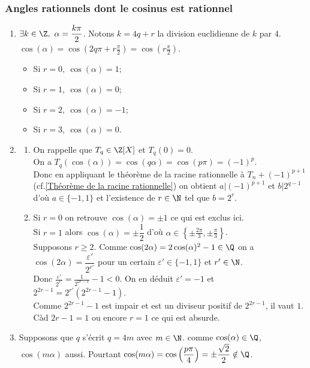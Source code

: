 \documentclass{book}
\begin{document}
	\subsubsection{Angles rationnels dont le cosinus est rationnel }
	\begin{enumerate}[leftmargin=*]
		\item $\exists k\in \Z,\ \alpha=\dfrac{k\pi}{2}$. Notons $k=4q+r$ la division euclidienne de $k$ par $4$.\\
		$\cos(\alpha)=\displaystyle\cos\left(2q\pi+r\frac{\pi}{2}\right)=\cos\left(r\frac{\pi}{2}\right)$.
		\begin{itemize}
			\item Si $r=0,\ \cos(\alpha)=1$;
			\item Si $r=1,\ \cos(\alpha)=0$;
			\item Si $r=2,\ \cos(\alpha)=-1$;
			\item Si $r=3,\ \cos(\alpha)=0$.
		\end{itemize}
		\item 
		\begin{enumerate}[label=\alph*.]
			\item On rappelle que $T_q\in \Z[X]$ et $T_q(0)=0$.\\
			On a $T_q(\cos(\alpha))=\cos(q\alpha)=\cos(p\pi)=(-1)^p$.\\
			Donc en appliquant le théorème de la racine rationnelle à $T_n+(-1)^{p+1}$ (cf.\ref{Théorème de la racine rationnelle}) on obtient $a|(-1)^{p+1}$ et $b|2^{q-1}$ d'où $a\in \{-1,1\}$ et l'existence de $r\in \N$ tel que $b=2^r$.
			\item Si $r=0$ on retrouve $\cos(\alpha)=\pm1$ ce qui est exclus ici.\\
			Si $r=1$ alors $\cos(\alpha)=\pm\dfrac{1}{2}$ d'où $\alpha\in \displaystyle\left\{\pm\frac{2\pi}{3},\pm\frac{\pi}{3}\right\}$.\\
			Supposons $r\geq 2$. Comme $\cos(2\alpha)=2\cos(\alpha)^2-1\in \Q$ on a $\cos(2\alpha)=\dfrac{\varepsilon'}{2^{r'}}$ pour un certain $\varepsilon'\in \{-1,1\}$ et $r'\in \N$.\\
			Donc $\displaystyle\frac{\varepsilon'}{2^{r'}}=\frac{1}{2^{2r-1}}-1<0$. On en déduit $\varepsilon'=-1$ et $2^{2r-1}=2^{r'}(2^{2r-1}-1)$.\\
			Comme $2^{2r-1}-1$ est impair et est un diviseur positif de $2^{2r-1}$, il vaut $1$. Càd $2r-1=1$ ou encore $r=1$ ce qui est absurde.
		\end{enumerate}
		\item Supposons que $q$ s'écrit $q=4m$ avec $m\in \N$. comme $\cos(\alpha)\in \Q$, $\cos(m\alpha)$ aussi. Pourtant $\cos(m\alpha)=\cos\left(\dfrac{p\pi}{4}\right)=\pm\dfrac{\sqrt 2}{2}\notin\Q$.\\

\end{enumerate}
\end{document}
